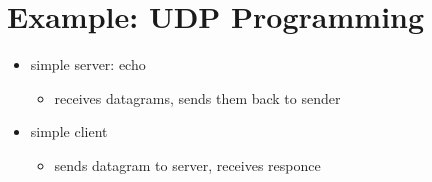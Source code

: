 \documentclass{report}
\begin{document}
\section{Example: UDP Programming}
\begin{itemize}
  \item simple server: echo
\begin{itemize}[label=$\circ$]
  \item receives datagrams, sends them back to sender
\end{itemize}
\item simple client
  \begin{itemize}[label=$\circ$]
    \item sends datagram to server, receives responce
  \end{itemize}
\end{itemize}
\newpage
\end{document}

